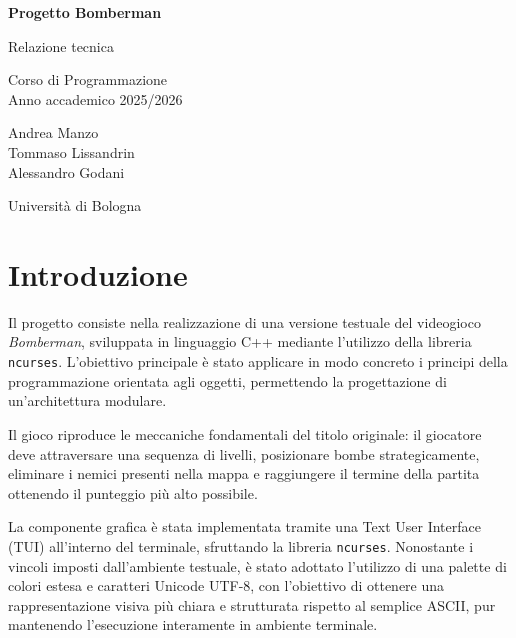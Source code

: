 \documentclass[a4paper,11pt]{article}
\begin{document}
\begin{titlepage}

\centering

\vspace*{2cm}

{\Huge\bfseries Progetto Bomberman\\[0.5cm]}

{\Large Relazione tecnica}

\vspace{1.5cm}

{\large
Corso di Programmazione\\
Anno accademico 2025/2026
}

\vfill

{\large
Andrea Manzo \\
Tommaso Lissandrin \\
Alessandro Godani
}

\vfill

{\large
Università di Bologna
}

\end{titlepage}


\tableofcontents
\newpage



\section{Introduzione}

Il progetto consiste nella realizzazione di una versione testuale del videogioco
\textit{Bomberman}, sviluppata in linguaggio C++ mediante l'utilizzo della
libreria \texttt{ncurses}. L'obiettivo principale è stato applicare in modo
concreto i principi della programmazione orientata agli oggetti, permettendo la
progettazione di un'architettura modulare.

Il gioco riproduce le meccaniche fondamentali del titolo originale: il giocatore
deve attraversare una sequenza di livelli, posizionare bombe strategicamente,
eliminare i nemici presenti nella mappa e raggiungere il termine della partita
ottenendo il punteggio più alto possibile.

La componente grafica è stata implementata tramite una Text User Interface (TUI)
all'interno del terminale, sfruttando la libreria \texttt{ncurses}. Nonostante
i vincoli imposti dall'ambiente testuale, è stato adottato l'utilizzo di una
palette di colori estesa e caratteri Unicode UTF-8, con l'obiettivo di ottenere
una rappresentazione visiva più chiara e strutturata rispetto al semplice ASCII,
pur mantenendo l'esecuzione interamente in ambiente terminale.
\end{document}
